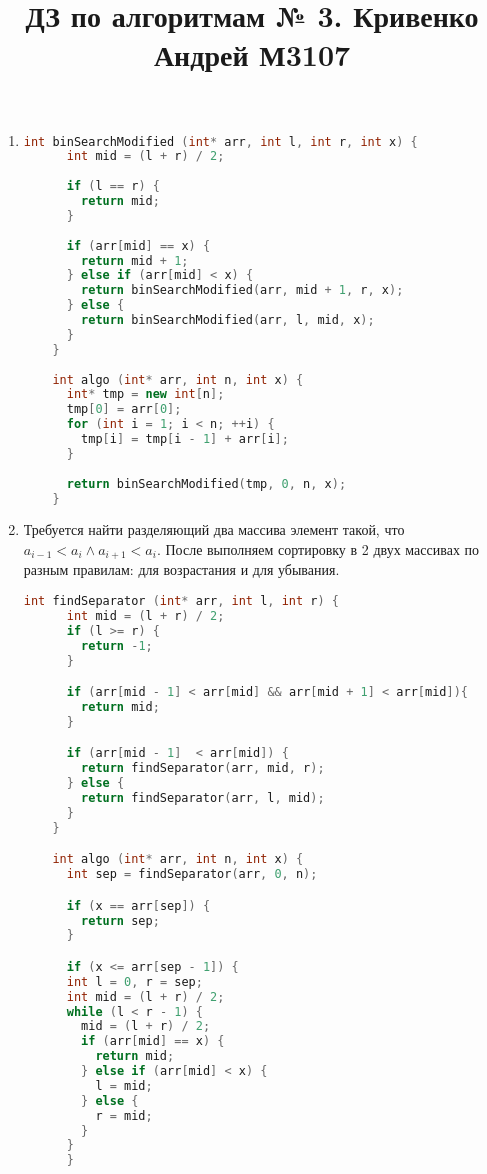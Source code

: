\documentclass{article}
\title{ДЗ по алгоритмам № 3. Кривенко Андрей М3107}
\begin{document}
\maketitle
\begin{enumerate}  
  \item \begin{lstlisting}[language=c++]
    int binSearchModified (int* arr, int l, int r, int x) {
      int mid = (l + r) / 2;
    
      if (l == r) {
        return mid;
      }
    
      if (arr[mid] == x) {
        return mid + 1;
      } else if (arr[mid] < x) {
        return binSearchModified(arr, mid + 1, r, x);
      } else {
        return binSearchModified(arr, l, mid, x);
      }
    }
    
    int algo (int* arr, int n, int x) {
      int* tmp = new int[n];
      tmp[0] = arr[0];
      for (int i = 1; i < n; ++i) {
        tmp[i] = tmp[i - 1] + arr[i];
      }
    
      return binSearchModified(tmp, 0, n, x);
    }
    \end{lstlisting}
  \item Требуется найти разделяющий два массива элемент такой, что $a_{i - 1} < a_{i} \wedge  a_{i + 1} < a_{i}$. 
  После выполняем сортировку в 2 двух массивах по разным правилам: для возрастания и для убывания.
  
  \begin{lstlisting}[language=c++]
    int findSeparator (int* arr, int l, int r) {
      int mid = (l + r) / 2;
      if (l >= r) {
        return -1;
      }

      if (arr[mid - 1] < arr[mid] && arr[mid + 1] < arr[mid]){
        return mid;
      }

      if (arr[mid - 1]  < arr[mid]) {
        return findSeparator(arr, mid, r);
      } else {
        return findSeparator(arr, l, mid);
      }
    }

    int algo (int* arr, int n, int x) {
      int sep = findSeparator(arr, 0, n);

      if (x == arr[sep]) {
        return sep;
      }

      if (x <= arr[sep - 1]) {
      int l = 0, r = sep;
      int mid = (l + r) / 2;
      while (l < r - 1) {
        mid = (l + r) / 2;
        if (arr[mid] == x) {
          return mid;
        } else if (arr[mid] < x) {
          l = mid;
        } else {
          r = mid;
        }
      }
      }


\end{lstlisting}
\end{enumerate}
\end{document}

